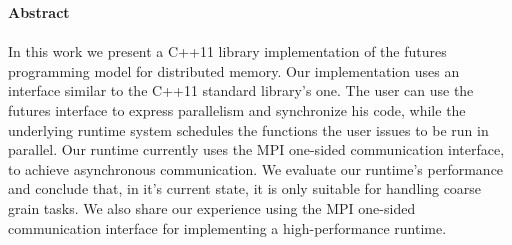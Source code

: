 \thispagestyle{empty}
\begin{titlepage}
\begin{center}
{\bf\Large Abstract}\\
\end{center}

\paragraph{}
In this work we present a C++11 library implementation of the futures programming model for distributed memory.
Our implementation uses an interface similar to the C++11 standard library's one.  The user can use the 
futures interface to express parallelism and synchronize his code, while the underlying runtime system
schedules the functions the user issues to be run in parallel.  Our runtime currently uses
 the MPI one-sided communication interface, to achieve asynchronous communication.  We evaluate our runtime's
performance and conclude that, in it's current state, it is only suitable for handling coarse grain tasks.
We also share our experience using the MPI one-sided communication interface for implementing a high-performance
runtime. 

\vfill
\end{titlepage}

